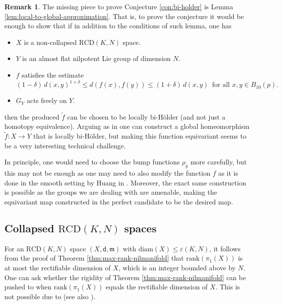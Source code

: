 \documentclass[12pt]{amsart}
\theoremstyle{definition}
\def\fnum{equation}
\newtheorem{remark}[\fnum]{Remark}
\numberwithin{equation}{section}
\newcommand{\rank}{{\text{rank}}}
\newcommand{\diam}{{\text {diam}}}
\newcommand{\rcd}{\text{RCD}}
\newcommand{\mm}{\mathfrak{m}}
\begin{document}
\begin{remark}
    The missing piece to prove Conjecture \ref{con:bi-holder} is Lemma \ref{lem:local-to-global-approximation}. That is, to prove the conjecture it would be enough to show that if in addition to the conditions of such lemma, one has
    \begin{itemize}
        \item $X$ is a non-collapsed $\rcd (K,N)$ space.
        \item $Y$ is an almost flat nilpotent Lie group of dimension $N$.
        \item $f$ satisfies the estimate
        \[              (1 - \delta  ) \, d( x,y ) ^{1 + \delta } \leq d ( f (x), f (y)  ) \leq (1 + \delta ) \, d (x,y) \, \text{ for all } x,y \in B_{10} (p)      .  \]
        \item  $G_Y$ acts freely on $Y$. 
    \end{itemize}
    then the produced $\tilde{f}$ can be chosen to be locally bi-H\"older (and not just a homotopy equivalence).  Arguing as in \cite[Theorem 3.3]{kapovitch-mondino} one can construct a global homeomorphism $\tilde{f} : X \to Y$ that is locally bi-H\"older, but making this function equivariant seems to be a very interesting technical challenge. 
    
     In principle,  one would need to choose the bump functions $\rho _g$ more carefully, but this may not be enough as one may need to also modify the function $f$  as it is done in the smooth setting by Huang in \cite{huang}. Moreover, the exact same construction is possible as the groups we are dealing with are amenable, making the equivariant map constructed in \cite[Theorems 1.3, 1.8]{huang} the perfect candidate to be the desired map.
\end{remark}



\subsection{Collapsed $\rcd (K,N)$ spaces} For an $\rcd (K,N)$ space $(X,\mathsf{d},\mm )$ with $\diam (X) \leq \varepsilon (K,N)$, it follows from the proof of Theorem \ref{thm:max-rank-nilmanifold} that $\rank (\pi_1 (X))$ is at most the rectifiable dimension of $X$, which is an integer bounded above by $N$. One can ask whether the rigidity of Theorem \ref{thm:max-rank-nilmanifold} can be pushed to when $\rank (\pi_1(X))$ equals the rectifiable dimension of $X$. This is not possible due to \cite{zhou} (see also \cite{hupp-naber-wang}). 
\end{document}
